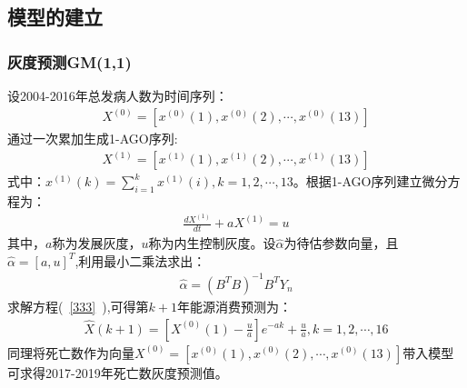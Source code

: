 \documentclass{whutmod}
\begin{document}
	    \subsection{模型的建立}
	    \subsubsection{灰度预测GM(1,1)}
	    设2004-2016年总发病人数为时间序列：
	     \begin{gather}
	    X^{(0)}=[x^{(0)}(1),x^{(0)}(2),\cdots,x^{(0)}(13)]
	    \end{gather}
	    通过一次累加生成1-AGO序列:
	    \begin{gather}
	    X^{(1)}=[x^{(1)}(1),x^{(1)}(2),\cdots,x^{(1)}(13)]
	    \end{gather}
	    式中：$x^{(1)}(k)=\sum_{i=1}^{k}x^{(1)}(i),k=1,2,\cdots,13$。根据1-AGO序列建立微分方程为：
	     \begin{gather}\label{333}
	    \frac{d X^{(1)}}{dt}+a X^{(1)} = u
	     \end{gather}
	     其中，$a$称为发展灰度，$u$称为内生控制灰度。设$\widehat{\alpha }$为待估参数向量，且$\widehat{\alpha }=[a,u]^T$,利用最小二乘法求出：
	     \begin{gather}
	     \widehat{\alpha }=(B^TB)^{-1}B^{T}Y_{n}
	     \end{gather}
	     求解方程(~\ref{333}~),可得第$k+1$年能源消费预测为：
	     \begin{gather}
	     \widehat{X}(k+1)=[X^{(0)}(1)-\frac{u}{a}]e^{-ak}+\frac{u}{a},k=1,2,\cdots,16
	     \end{gather}
	     同理将死亡数作为向量$X^{(0)}=[x^{(0)}(1),x^{(0)}(2),\cdots,x^{(0)}(13)]$带入模型可求得2017-2019年死亡数灰度预测值。
\end{document}
